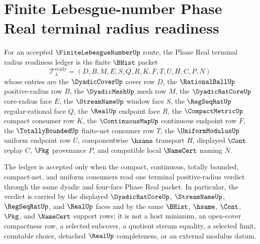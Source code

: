 \section{Finite Lebesgue-number Phase Real terminal radius readiness}
\label{sec:finite-lebesgue-number-phase-real-terminal-radius-readiness}

\begin{definition}
\label{def:finite-lebesgue-number-phase-real-terminal-radius-readiness-ledger}
For an accepted $\FiniteLebesgueNumberUp$ route, the Phase Real terminal radius readiness ledger is the finite $\BHist$ packet
$$
\mathcal{T}_{\lambda}^{\mathrm{ready}}=(D,B,M,E,S,Q,R,K,F,T,U,H,C,P,N)
$$
whose entries are the $\DyadicCoverUp$ cover row $D$, the $\RationalBallUp$ positive-radius row $B$, the $\DyadicMeshUp$ mesh row $M$, the $\DyadicRatCoreUp$ core-radius face $E$, the $\StreamNameUp$ window face $S$, the $\RegSeqRatUp$ regular-rational face $Q$, the $\RealUp$ endpoint face $R$, the $\CompactMetricUp$ compact consumer row $K$, the $\ContinuousMapUp$ continuous endpoint row $F$, the $\TotallyBoundedUp$ finite-net consumer row $T$, the $\UniformModulusUp$ uniform endpoint row $U$, componentwise $\hsame$ transport $H$, displayed $\Cont$ replay $C$, $\Pkg$ provenance $P$, and compatible local $\NameCert$ naming $N$.

The ledger is accepted only when the compact, continuous, totally bounded, compact-net, and uniform consumers read one terminal positive-radius verdict through the same dyadic and four-face Phase Real packet. In particular, the verdict is carried by the displayed $\DyadicRatCoreUp$, $\StreamNameUp$, $\RegSeqRatUp$, and $\RealUp$ faces and by the same $\BHist$, $\hsame$, $\Cont$, $\Pkg$, and $\NameCert$ support rows; it is not a host minimum, an open-cover compactness row, a selected subcover, a quotient stream equality, a selected limit, countable choice, detached $\RealUp$ completeness, or an external modulus datum.
\end{definition}

